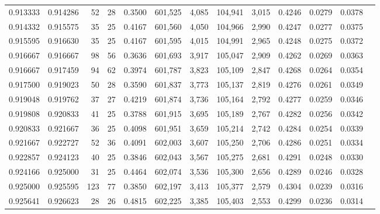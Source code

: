 \begin{tabular}{rrrrrrrrrrrrr}
0.913333 & 0.914286 &     52 &    28 &                                     0.3500 & 601,525 &   4,085 & 104,941 &   3,015 & 0.4246 & 0.0279 & 0.0378 \\
0.914332 & 0.915575 &     35 &    25 &                                     0.4167 & 601,560 &   4,050 & 104,966 &   2,990 & 0.4247 & 0.0277 & 0.0375 \\
0.915595 & 0.916630 &     35 &    25 &                                     0.4167 & 601,595 &   4,015 & 104,991 &   2,965 & 0.4248 & 0.0275 & 0.0372 \\
0.916667 & 0.916667 &     98 &    56 &                                     0.3636 & 601,693 &   3,917 & 105,047 &   2,909 & 0.4262 & 0.0269 & 0.0363 \\
0.916667 & 0.917459 &     94 &    62 &                                     0.3974 & 601,787 &   3,823 & 105,109 &   2,847 & 0.4268 & 0.0264 & 0.0354 \\
0.917500 & 0.919023 &     50 &    28 &                                     0.3590 & 601,837 &   3,773 & 105,137 &   2,819 & 0.4276 & 0.0261 & 0.0349 \\
0.919048 & 0.919762 &     37 &    27 &                                     0.4219 & 601,874 &   3,736 & 105,164 &   2,792 & 0.4277 & 0.0259 & 0.0346 \\
0.919808 & 0.920833 &     41 &    25 &                                     0.3788 & 601,915 &   3,695 & 105,189 &   2,767 & 0.4282 & 0.0256 & 0.0342 \\
0.920833 & 0.921667 &     36 &    25 &                                     0.4098 & 601,951 &   3,659 & 105,214 &   2,742 & 0.4284 & 0.0254 & 0.0339 \\
0.921667 & 0.922727 &     52 &    36 &                                     0.4091 & 602,003 &   3,607 & 105,250 &   2,706 & 0.4286 & 0.0251 & 0.0334 \\
0.922857 & 0.924123 &     40 &    25 &                                     0.3846 & 602,043 &   3,567 & 105,275 &   2,681 & 0.4291 & 0.0248 & 0.0330 \\
0.924166 & 0.925000 &     31 &    25 &                                     0.4464 & 602,074 &   3,536 & 105,300 &   2,656 & 0.4289 & 0.0246 & 0.0328 \\
0.925000 & 0.925595 &    123 &    77 &                                     0.3850 & 602,197 &   3,413 & 105,377 &   2,579 & 0.4304 & 0.0239 & 0.0316 \\
0.925641 & 0.926623 &     28 &    26 &                                     0.4815 & 602,225 &   3,385 & 105,403 &   2,553 & 0.4299 & 0.0236 & 0.0314 \\

\end{tabular}
